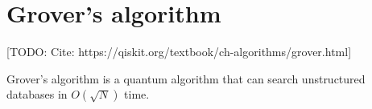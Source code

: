 \chapter{Grover's algorithm}

[TODO: Cite: https://qiskit.org/textbook/ch-algorithms/grover.html]

Grover's algorithm is a quantum algorithm that can search unstructured databases in $O(\sqrt{N})$ time.
